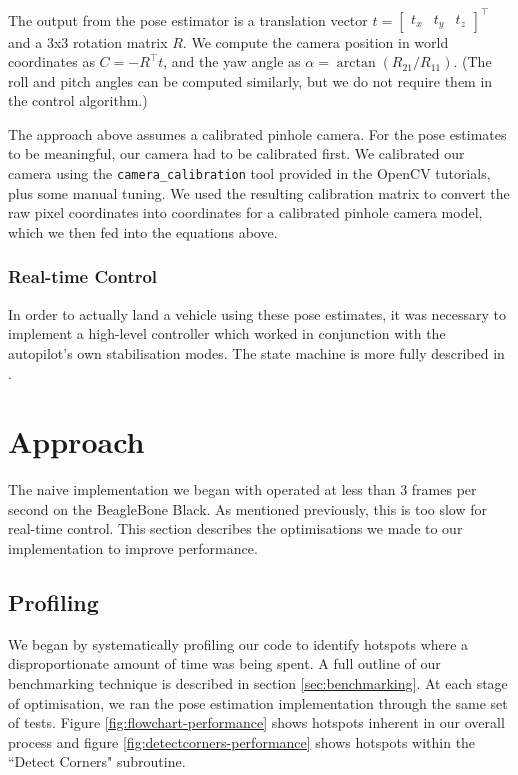 \documentclass{acm_proc_article-sp}
\begin{document}
The output from the pose estimator is a translation vector
$t = \begin{bmatrix} t_x & t_y & t_z \end{bmatrix}^\top$
and a 3x3 rotation matrix $R$. We compute the camera position in world
coordinates as $C = -R^\top t$, and the yaw angle as
$\alpha = \arctan(R_{21} / R_{11})$. (The roll and pitch angles can be computed
similarly, but we do not require them in the control algorithm.)

The approach above assumes a calibrated pinhole camera. For the pose estimates
to be meaningful, our camera had to be calibrated first. We calibrated our
camera using the {\tt camera\_calibration} tool provided in the OpenCV
tutorials, plus some manual tuning. We used the resulting calibration matrix to
convert the raw pixel coordinates into coordinates for a calibrated pinhole
camera model, which we then fed into the equations above.

\subsubsection{Real-time Control}
In order to actually land a vehicle using these pose estimates, it was necessary to implement a high-level controller which worked in conjunction with the autopilot's own stabilisation modes. The state machine is more fully described in \cite{berzanaccurate}.

\section{Approach\label{sec:approach}}

The naive implementation we began with operated at less than 3 frames per second on the BeagleBone Black. As mentioned previously, this is too slow for real-time control. This section describes the optimisations we made to our implementation to improve performance.

\subsection{Profiling}
We began by systematically profiling our code to identify hotspots where a disproportionate amount of time was being spent.  A full outline of our benchmarking technique is described in section \ref{sec:benchmarking}. At each stage of optimisation, we ran the pose estimation implementation through the same set of tests. Figure \ref{fig:flowchart-performance} shows hotspots inherent in our overall process and figure \ref{fig:detectcorners-performance} shows hotspots within the ``Detect Corners" subroutine. 
\end{document}
